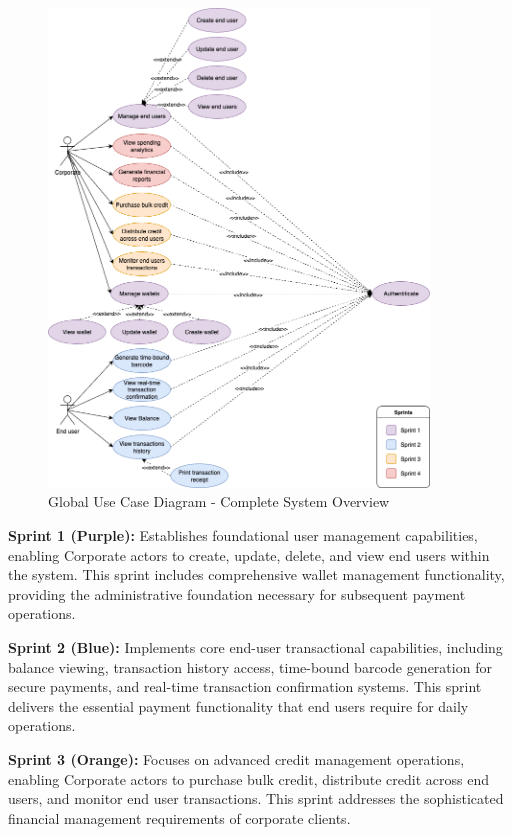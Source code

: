 \begin{figure}[H]
    \centering
    \includegraphics[width=0.9\textwidth]{images/usecase_global.png}
    \caption{Global Use Case Diagram - Complete System Overview}
    \label{fig:global_usecase}
\end{figure}

\textbf{Sprint 1 (Purple):} Establishes foundational user management capabilities, enabling Corporate actors to create, update, delete, and view end users within the system. This sprint includes comprehensive wallet management functionality, providing the administrative foundation necessary for subsequent payment operations.

\textbf{Sprint 2 (Blue):} Implements core end-user transactional capabilities, including balance viewing, transaction history access, time-bound barcode generation for secure payments, and real-time transaction confirmation systems. This sprint delivers the essential payment functionality that end users require for daily operations.

\textbf{Sprint 3 (Orange):} Focuses on advanced credit management operations, enabling Corporate actors to purchase bulk credit, distribute credit across end users, and monitor end user transactions. This sprint addresses the sophisticated financial management requirements of corporate clients.

